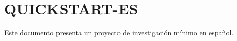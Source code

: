 \documentclass{abntexto-ufc}
\begin{document}
\section{QUICKSTART-ES}
Este documento presenta un proyecto de investigación mínimo en español.
\end{document}
